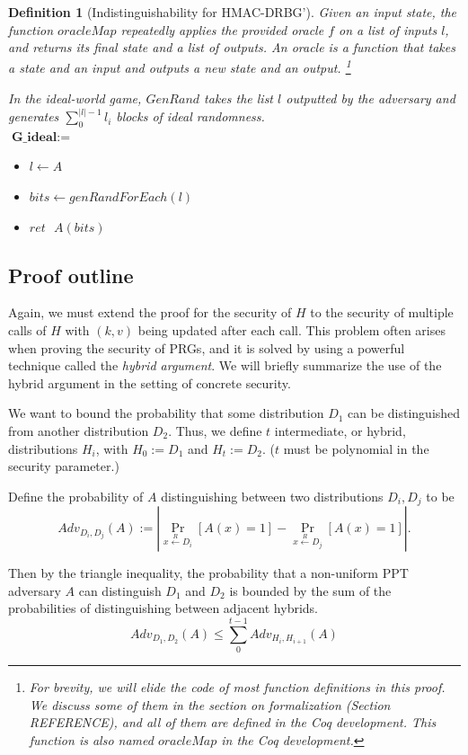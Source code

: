 \documentclass[12pt,lot, lof]{puthesis}
\newenvironment{game}
{ \begin{itemize}[noitemsep,nolistsep] 
}
{ \end{itemize}                  }
\newcommand{\s} {\textrm{ }}
\newtheorem{dfn}[thm]{Definition}
\begin{document}
{\begin{dfn}[Indistinguishability for HMAC-DRBG']
Given an input state, the function $oracleMap$ repeatedly applies the provided oracle $f$ on a list of inputs $l$, and returns its final state and a list of outputs. An oracle is a function that takes a state and an input and outputs a new state and an output. \footnote{For brevity, we will elide the code of most function definitions in this proof. We discuss some of them in the section on formalization (Section REFERENCE), and all of them are defined in the Coq development. This function is also named $oracleMap$ in the Coq development.}

In the ideal-world game, $GenRand$ takes the list $l$ outputted by the adversary and generates $\sum_0^{|l|-1} l_i$ blocks of ideal randomness.\\

$\textbf{G\_ideal} := $
\begin{game}
\item[] $l \leftarrow A$ 
\item[] $bits \leftarrow genRandForEach(l)$
\item[] $ret \s A(bits)$ \\
\end{game}
\end{dfn}

\subsection{Proof outline} \label{sec:proof_outline}
Again, we must extend the proof for the security of $H$ to the security of multiple calls of $H$ with $(k,v)$ being updated after each call. This problem often arises when proving the security of PRGs, and it is solved by using a powerful technique called the \emph{hybrid argument}. We will briefly summarize the use of the hybrid argument in the setting of concrete security.

We want to bound the probability that some distribution $D_1$ can be distinguished from another distribution $D_2$. Thus, we define $t$ intermediate, or hybrid, distributions $H_i$, with $H_0 := D_1$ and $H_t := D_2$. ($t$ must be polynomial in the security parameter.) 

Define the probability of $A$ distinguishing between two distributions $D_i, D_j$ to be 
$$Adv_{D_i, D_j}(A) := | \Pr_{x \xleftarrow{R} D_i} [A(x) = 1] - \Pr_{x \xleftarrow{R} D_j} [A(x) = 1] |.$$

Then by the triangle inequality, the probability that a non-uniform PPT adversary $A$ can distinguish $D_1$ and $D_2$ is bounded by the sum of the probabilities of distinguishing between adjacent hybrids.
$$Adv_{D_1, D_2}(A) \leq \sum_{0}^{t-1} Adv_{H_i, H_{i+1}}(A)$$

}
\end{document}
